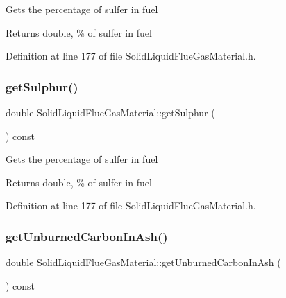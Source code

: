 Gets the percentage of sulfer in fuel \begin{DoxyReturn}{Returns}
double, \% of sulfer in fuel 
\end{DoxyReturn}


Definition at line 177 of file Solid\+Liquid\+Flue\+Gas\+Material.\+h.

\mbox{\label{class_solid_liquid_flue_gas_material_abe35d8ff283bfa5aadcf00f9906025ae}} 
\subsubsection{\texorpdfstring{get\+Sulphur()}{getSulphur()}\hspace{0.1cm}{\footnotesize\ttfamily [3/3]}}
{\footnotesize\ttfamily double Solid\+Liquid\+Flue\+Gas\+Material\+::get\+Sulphur (\begin{DoxyParamCaption}{ }\end{DoxyParamCaption}) const\hspace{0.3cm}{\ttfamily [inline]}}

Gets the percentage of sulfer in fuel \begin{DoxyReturn}{Returns}
double, \% of sulfer in fuel 
\end{DoxyReturn}


Definition at line 177 of file Solid\+Liquid\+Flue\+Gas\+Material.\+h.

\mbox{\label{class_solid_liquid_flue_gas_material_a53ac34a949168a35297ab3afb9eb2c7b}} 
\subsubsection{\texorpdfstring{get\+Unburned\+Carbon\+In\+Ash()}{getUnburnedCarbonInAsh()}\hspace{0.1cm}{\footnotesize\ttfamily [1/3]}}
{\footnotesize\ttfamily double Solid\+Liquid\+Flue\+Gas\+Material\+::get\+Unburned\+Carbon\+In\+Ash (\begin{DoxyParamCaption}{ }\end{DoxyParamCaption}) const\hspace{0.3cm}{\ttfamily [inline]}}


